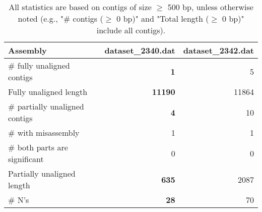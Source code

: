 \documentclass[12pt,a4paper]{article}
\begin{document}
\begin{table}[ht]
\begin{center}
\caption{All statistics are based on contigs of size $\geq$ 500 bp, unless otherwise noted (e.g., "\# contigs ($\geq$ 0 bp)" and "Total length ($\geq$ 0 bp)" include all contigs).}
\begin{tabular}{|l*{2}{|r}|}
\hline
Assembly & dataset\_2340.dat & dataset\_2342.dat \\ \hline
\# fully unaligned contigs & {\bf 1} & 5 \\ \hline
Fully unaligned length & {\bf 11190} & 11864 \\ \hline
\# partially unaligned contigs & {\bf 4} & 10 \\ \hline
\hspace{5mm}\# with misassembly & 1 & 1 \\ \hline
\hspace{5mm}\# both parts are significant & 0 & 0 \\ \hline
Partially unaligned length & {\bf 635} & 2087 \\ \hline
\# N's & {\bf 28} & 70 \\ \hline
\end{tabular}
\end{center}
\end{table}
\end{document}
